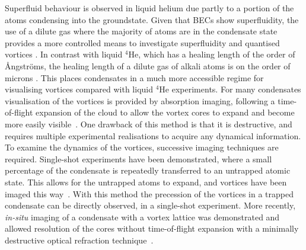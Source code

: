 Superfluid behaviour is observed in liquid helium due partly to a portion of the atoms condensing into the groundstate. Given that BECs show superfluidity, the use of a dilute gas where the majority of atoms are in the condensate state provides a more controlled means to investigate superfluidity and quantised vortices \cite{BK:Ueda_2010,BEC:Srinivasen_pramana_2006,Vtx:Tsubota_arxiv_2010,CT:Tsubota_jpsj_2008}. In contrast with liquid $^4$He, which has a healing length of the order of {\r{A}}ngstr{\"o}ms, the healing length of a dilute gas of alkali atoms is on the order of microns \cite{Vtx:Isoshima_pra_1999}. This places condensates in a much more accessible regime for visualising vortices compared with liquid $^4$He experiments. For many condensates visualisation of the vortices is provided by absorption imaging, following a time-of-flight expansion of the cloud to allow the vortex cores to expand and become more easily visible~\cite{Vtx:Raman_prl_2001,VTX:Rankonjac_pra_2016}. One drawback of this method is that it is destructive, and requires multiple experimental realisations to acquire any dynamical information. To examine the dynamics of the vortices, successive imaging techniques are required. Single-shot experiments have been demonstrated, where a small percentage of the condensate is repeatedly transferred to an untrapped atomic state. This allows for the untrapped atoms to expand, and vortices have been imaged this way~\cite{VTX:Freilich_sci_2010}. With this method the precession of the vortices in a trapped condensate can be directly observed, in a single-shot experiment. More recently, \textit{in-situ} imaging of a condensate with a vortex lattice was demonstrated and allowed resolution of the cores without time-of-flight expansion with a minimally destructive optical refraction technique~\cite{VTX:Wilson_pra_2015}.

